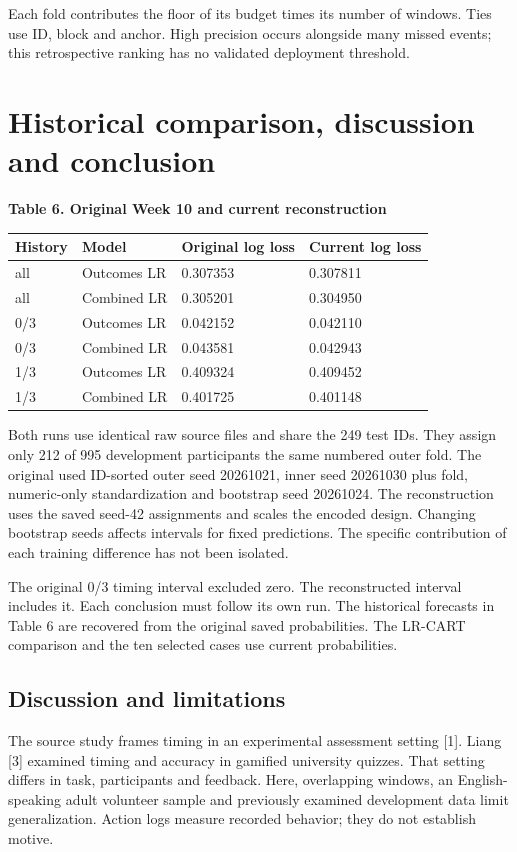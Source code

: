 \documentclass[10pt]{article}
\begin{document}
Each fold contributes the floor of its budget times its number of windows. Ties use ID, block and anchor. High precision occurs alongside many missed events; this retrospective ranking has no validated deployment threshold.

\clearpage
\section*{Historical comparison, discussion and conclusion}
\noindent\textbf{Table 6. Original Week 10 and current reconstruction}\par
\begin{tabular}{llll}
\toprule
History & Model & Original log loss & Current log loss \\
\midrule
all & Outcomes LR & 0.307353 & 0.307811 \\
all & Combined LR & 0.305201 & 0.304950 \\
0/3 & Outcomes LR & 0.042152 & 0.042110 \\
0/3 & Combined LR & 0.043581 & 0.042943 \\
1/3 & Outcomes LR & 0.409324 & 0.409452 \\
1/3 & Combined LR & 0.401725 & 0.401148 \\
\bottomrule
\end{tabular}

Both runs use identical raw source files and share the 249 test IDs. They assign only 212 of 995 development participants the same numbered outer fold. The original used ID-sorted outer seed 20261021, inner seed 20261030 plus fold, numeric-only standardization and bootstrap seed 20261024. The reconstruction uses the saved seed-42 assignments and scales the encoded design. Changing bootstrap seeds affects intervals for fixed predictions. The specific contribution of each training difference has not been isolated.

The original 0/3 timing interval excluded zero. The reconstructed interval includes it. Each conclusion must follow its own run. The historical forecasts in Table 6 are recovered from the original saved probabilities. The LR-CART comparison and the ten selected cases use current probabilities.

\subsection*{Discussion and limitations}
The source study frames timing in an experimental assessment setting [1]. Liang [3] examined timing and accuracy in gamified university quizzes. That setting differs in task, participants and feedback. Here, overlapping windows, an English-speaking adult volunteer sample and previously examined development data limit generalization. Action logs measure recorded behavior; they do not establish motive.
\end{document}
